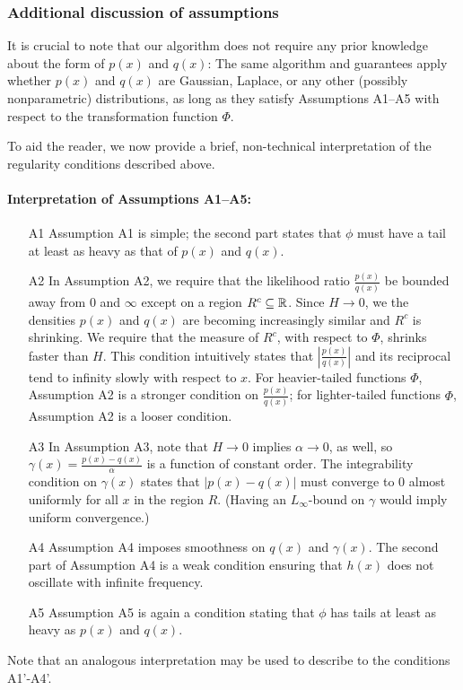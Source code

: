 \documentclass{article}
\begin{document}
\subsubsection{Additional discussion of assumptions}

It is crucial to note that our algorithm does not require any prior knowledge about the form of $p(x)$ and $q(x)$: The same algorithm and guarantees apply whether $p(x)$ and $q(x)$ are Gaussian, Laplace, or any other (possibly nonparametric) distributions, as long as they satisfy Assumptions A1--A5 with respect to the transformation function $\Phi$. 

To aid the reader, we now provide a brief, non-technical interpretation of the regularity conditions described above.

\paragraph{\textbf{Interpretation of Assumptions A1--A5:}}

\begin{enumerate}
\item[A1] Assumption A1 is simple; the second part states that $\phi$ must have a tail at least as heavy as that of $p(x)$ and $q(x)$. 
\item[A2] In Assumption A2, we require that the likelihood ratio $\frac{p(x)}{q(x)}$ be bounded away from 0 and $\infty$ except on a region $ R^c \subseteq {\mathbb R}$. Since $H \rightarrow 0$, we the densities $p(x)$ and $q(x)$ are becoming increasingly similar and $R^c$ is shrinking. We require that the measure of $R^c$, with respect to $\Phi$, shrinks faster than $H$. This condition intuitively states that $|\frac{p(x)}{q(x)}|$ and its reciprocal tend to infinity slowly with respect to $x$. For heavier-tailed functions $\Phi$, Assumption A2 is a stronger condition on $\frac{p(x)}{q(x)}$; for lighter-tailed functions $\Phi$, Assumption A2 is a looser condition.
\item[A3] In Assumption A3, note that $H \rightarrow 0$ implies $\alpha \rightarrow 0$, as well, so $\gamma(x) = \frac{p(x) - q(x)}{\alpha}$ is a function of constant order. The integrability condition on $\gamma(x)$ states that $|p(x) - q(x)|$ must converge to 0 almost uniformly for all $x$ in the region $R$. (Having an $L_\infty$-bound on $\gamma$ would imply uniform convergence.) 
\item[A4]  Assumption A4 imposes smoothness on $q(x)$ and $\gamma(x)$. The second part of Assumption A4 is a weak condition ensuring that $h(x)$ does not oscillate with infinite frequency. 
\item[A5] Assumption A5 is again a condition stating that $\phi$ has tails at least as heavy as $p(x)$ and $q(x)$. 
\end{enumerate}
Note that an analogous interpretation may be used to describe to the conditions A1'-A4'.
\end{document}
